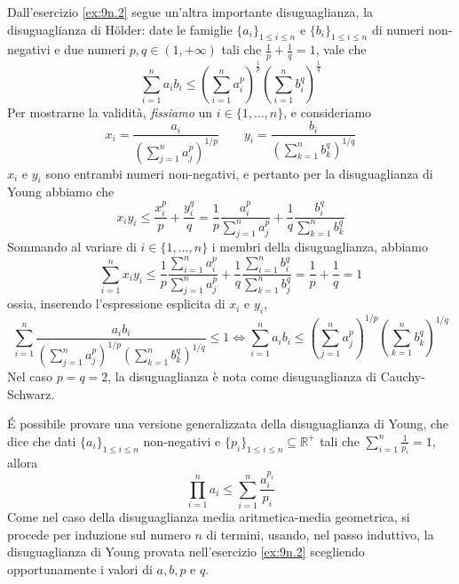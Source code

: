     \begin{remark}
        Dall'esercizio \ref{ex:9n.2} segue un'altra importante disuguaglianza, la disuguaglianza di H{\"o}lder: date le famiglie $\{a_i\}_{1\le i \le n}$ e $\{b_i\}_{1\le i \le n}$ di numeri non-negativi e due numeri $p,q\in(1,+\infty)$ tali che $\frac{1}{p}+\frac{1}{q}=1$, vale che
        \[
        \sum_{i=1}^n a_i b_i \le \left(\sum_{i=1}^n a_i^p\right)^{\frac{1}{p}}\left(\sum_{i=1}^n b_i^q\right)^{\frac{1}{q}}
        \]
        Per mostrarne la validità, \emph{fissiamo} un $i\in\{1, \dots, n\}$, e consideriamo
        \[
        x_i=\frac{a_i}{\left(\sum_{j=1}^n a_j^p\right)^{1/p}} \qquad y_i=\frac{b_i}{\left(\sum_{k=1}^n b_k^q\right)^{1/q}}
        \]
        $x_i$ e $y_i$ sono entrambi numeri non-negativi, e pertanto per la disuguaglianza di Young abbiamo che
        \[
        x_i y_i \le \frac{x_i^p}{p} + \frac{y_i^q}{q} =\frac{1}{p} \frac{a_i^p}{\sum_{j=1}^n a_j^p}+\frac{1}{q}\frac{b_i^q}{\sum_{k=1}^n b_k^q}
        \]
        Sommando al variare di $i\in\{1,\dots, n\}$ i membri della disuguaglianza, abbiamo
        \[
        \sum_{i=1}^n x_i y_i \le \frac{1}{p}\frac{\sum_{i=1}^n a_i^p}{\sum_{j=1}^n a_j^p} + \frac{1}{q}\frac{\sum_{i=1}^n b_i^q}{\sum_{k=1}^n b_j^q}  = \frac{1}{p}+\frac{1}{q}=1
        \]
        ossia, inserendo l'espressione esplicita di $x_i$ e $y_i$,
        \[
        \sum_{i=1}^n \frac{a_i b_i}{\left(\sum_{j=1}^n a_j^p\right)^{1/p}\left(\sum_{k=1}^n b_k^q\right)^{1/q}} \le 1 \iff \sum_{i=1}^n {a_i b_i}\le \left(\sum_{j=1}^n a_j^p\right)^{1/p}\left(\sum_{k=1}^n b_k^q\right)^{1/q}
        \]
        Nel caso $p=q=2$, la disuguaglianza è nota come disuguaglianza di Cauchy-Schwarz.
    \end{remark}
    \begin{remark}
        \'E possibile provare una versione generalizzata della disuguaglianza di Young, che dice che dati $\{a_i\}_{1\le i\le n} $ non-negativi e $\{p_i\}_{1\le i \le n}\subseteq \mathbb{R}^+$ tali che $\sum_{i=1}^n \frac{1}{p_i} = 1$, allora
        \[
        \prod_{i=1}^n a_i \le \sum_{i=1}^n \frac{a_i^{p_i}}{p_i}
        \]
        Come nel caso della disuguaglianza media aritmetica-media geometrica, si procede per induzione sul numero $n$ di termini, usando, nel passo induttivo, la disuguaglianza di Young provata nell'esercizio \ref{ex:9n.2} scegliendo opportunamente i valori di $a, b, p$ e $q$.
    \end{remark}
